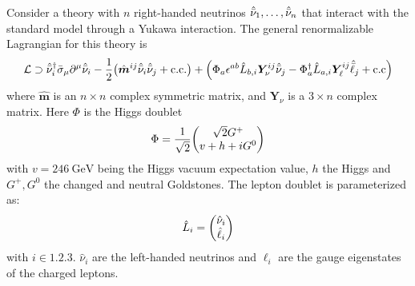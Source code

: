Consider a theory with \(n\) right-handed neutrinos \(\hat{\bar{\nu}}_1, \dots, \hat{\bar{\nu}}_n\) that
interact with the standard model through a Yukawa interaction. The general
renormalizable Lagrangian for this theory is
\begin{align}\label{eqn:GeneralRHN}
	\mathcal{L}\supset
	\hat{\bar{\nu}}_i^{\dagger}\bar{\sigma}_{\mu}\partial^{\mu}\hat{\bar{\nu}}_i
	-\frac{1}{2}\qty(\hat{\bm{m}}^{ij}\hat{\bar{\nu}}_i\hat{\bar{\nu}}_j + \mathrm{c.c.})
	+ \qty(\Phi_{a}\epsilon^{ab}\hat{L}_{b,i}\bm{Y}^{ij}_{\nu}\hat{\bar{\nu}}_{j}
	- \Phi_{a}^{\dagger}\hat{L}_{a,i}\bm{Y}^{ij}_{\ell}\hat{\bar{\ell}}_{j} + \mathrm{c.c})
\end{align}
where \(\hat{\bm{m}}\) is an \(n\times n\) complex symmetric matrix, and
\(\bm{Y}_{\nu}\) is a \(3\times n\) complex matrix. Here \(\Phi\) is the Higgs doublet
\begin{align}
	\Phi = \frac{1}{\sqrt{2}}\mqty(\sqrt{2}G^{+} \\ v + h + iG^{0})
\end{align}
with \(v = 246 \ \mathrm{GeV}\) being the Higgs vacuum expectation value, \(h\)
the Higgs and \(G^{+},G^{0}\) the changed and neutral Goldstones. The lepton
doublet is parameterized as:
\begin{align}
	\hat{L}_{i} = \mqty(\hat{\nu}_i \\ \hat{\ell}_i)
\end{align}
with \(i\in\qty{1,2,3}\). \(\hat{\nu}_i\) are the left-handed neutrinos and
\(\ell_i\) are the gauge eigenstates of the charged leptons.

